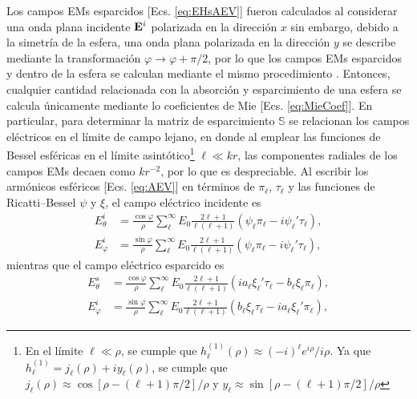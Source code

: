 \documentclass[letterpaper,11pt] {article}
\begin{document}
Los campos EMs esparcidos [Ecs. \eqref{eq:EHsAEV}] fueron calculados al considerar una onda plana incidente $\vb{E}^i$ polarizada en la dirección $x$ sin embargo, debido a la simetría de la esfera, una onda plana polarizada en la dirección $y$ se describe mediante la transformación $\varphi\to\varphi+\pi/2$, por lo que los campos EMs esparcidos y dentro de la esfera se calculan mediante el mismo procedimiento \cite{bohren1998absorption}. Entonces, cualquier cantidad relacionada con la absorción y esparcimiento de una esfera se calcula únicamente mediante lo coeficientes de Mie [Ecs. \eqref{eq:MieCoef}]. En particular, para determinar la matriz de esparcimiento $\mathbb{S}$ se relacionan los campos eléctricos en el límite de campo lejano, en donde al emplear las funciones de Bessel esféricas en el límite asintótico\footnote{En el límite $\ell \ll \rho$, se cumple que $h_\ell^{(1)}(\rho)\approx (-i)^\ell e^{i\rho}/i\rho$. Ya que $h_\ell^{(1)} = j_\ell(\rho)+iy_\ell(\rho)$, se cumple que $j_\ell(\rho) \approx \cos[\rho-(\ell+1)\pi/2]/\rho$ y $ y_\ell \approx \sin[\rho-(\ell+1)\pi/2]/\rho$} $\ell \ll kr$, las componentes radiales de los campos EMs decaen como $kr^{-2}$, por lo que es despreciable. Al escribir los armónicos esféricos  [Ecs. \eqref{eq:AEV}] en términos de $\pi_\ell$, $\tau_\ell$ y las funciones de Ricatti--Bessel $\psi$ y $\xi$, el campo eléctrico incidente es
	\begin{align}
	E_\theta^i &= \frac{\cos\varphi}{\rho}\sum_\ell^\infty E_0\frac{2\ell+1}{\ell(\ell+1)}
														(\psi_\ell\pi_\ell-i\psi_\ell'\tau_\ell),\\
	E_\varphi^i &= \frac{\sin\varphi}{\rho}\sum_\ell^\infty E_0\frac{2\ell+1}{\ell(\ell+1)}
														(\psi_\ell\pi_\ell-i\psi_\ell'\tau_\ell),			
	\end{align}
mientras que el campo eléctrico esparcido es
	\begin{align}
	E_\theta^s &= \frac{\cos\varphi}{\rho}\sum_\ell^\infty E_0\frac{2\ell+1}{\ell(\ell+1)}
												(i a_\ell\xi_\ell'\tau_\ell-b_\ell\xi_\ell\pi_\ell),\\
	E_\varphi^i &= \frac{\sin\varphi}{\rho}\sum_\ell^\infty E_0\frac{2\ell+1}{\ell(\ell+1)}
												(b_\ell\xi_\ell\tau_\ell-ia_\ell\xi_\ell'\pi_\ell),
	\end{align}
\end{document}
